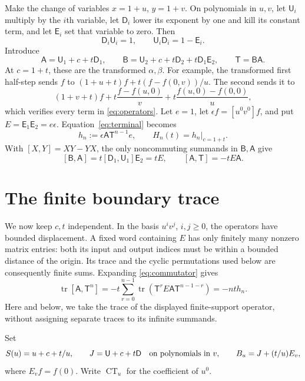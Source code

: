 \documentclass[11pt]{article}
\DeclareMathOperator{\CT}{CT}
\DeclareMathOperator{\tr}{tr}
\newcommand{\A}{\mathsf A}
\newcommand{\B}{\mathsf B}
\newcommand{\T}{\mathsf T}
\begin{document}
Make the change of variables $x=1+u$, $y=1+v$. On polynomials in $u,v$,
let $\mathsf U_i$ multiply by the $i$th variable, let $\mathsf D_i$
lower its exponent by one and kill its constant term, and let
$\mathsf E_i$ set that variable to zero. Then
\[
 \mathsf D_i\mathsf U_i=1,\qquad
 \mathsf U_i\mathsf D_i=1-\mathsf E_i.
\]
Introduce
\begin{equation}\label{eq:operators}
 \A=\mathsf U_1+c+t\mathsf D_1,\qquad
 \B=\mathsf U_2+c+t\mathsf D_2+t\mathsf D_1\mathsf E_2,
 \qquad \T=\B\A.
\end{equation}
At $c=1+t$, these are the transformed $\alpha,\beta$. For example,
the transformed first half-step sends $f$ to
$(1+u+t)f+t(f-f(0,v))/u$. The second sends it to
\[
 (1+v+t)f+t\frac{f-f(u,0)}{v}
                    +t\frac{f(u,0)-f(0,0)}{u},
\]
which verifies every term in \eqref{eq:operators}.
Let $e=1$, let $\epsilon f=[u^0v^0]f$, and put
$E=\mathsf E_1\mathsf E_2=e\epsilon$. Equation~\eqref{eq:terminal} becomes
\begin{equation}\label{eq:moment}
 h_n:=\epsilon\A\T^{n-1}e,\qquad H_n(t)=h_n\big|_{c=1+t}.
\end{equation}
With $[X,Y]=XY-YX$, the only noncommuting summands in $\B,\A$ give
\begin{equation}\label{eq:commutator}
 [\B,\A]=t[\mathsf D_1,\mathsf U_1]\mathsf E_2=tE,
 \qquad [\A,\T]=-tE\A.
\end{equation}

\section{The finite boundary trace}
We now keep $c,t$ independent. In the basis $u^iv^j$, $i,j\geq0$, the
operators have bounded displacement. A fixed word containing $E$ has
only finitely many nonzero matrix entries: both its input and output
indices must be within a bounded distance of the origin. Its trace and
the cyclic permutations used below are consequently finite sums.
Expanding \eqref{eq:commutator} gives
\begin{equation}\label{eq:trace}
 \tr[\A,\T^n]
 =-t\sum_{r=0}^{n-1}\tr(\T^rE\A\T^{n-1-r})=-nt h_n.
\end{equation}
Here and below, we take the trace of the displayed finite-support
operator, without assigning separate traces to its infinite summands.

Set
\[
 S(u)=u+c+t/u,\qquad J=\mathsf U+c+t\mathsf D
       \quad\hbox{on polynomials in }v,
 \qquad B_u=J+(t/u)E_v,
\]
where $E_vf=f(0)$. Write $\CT_u$ for the coefficient of $u^0$.
\end{document}
